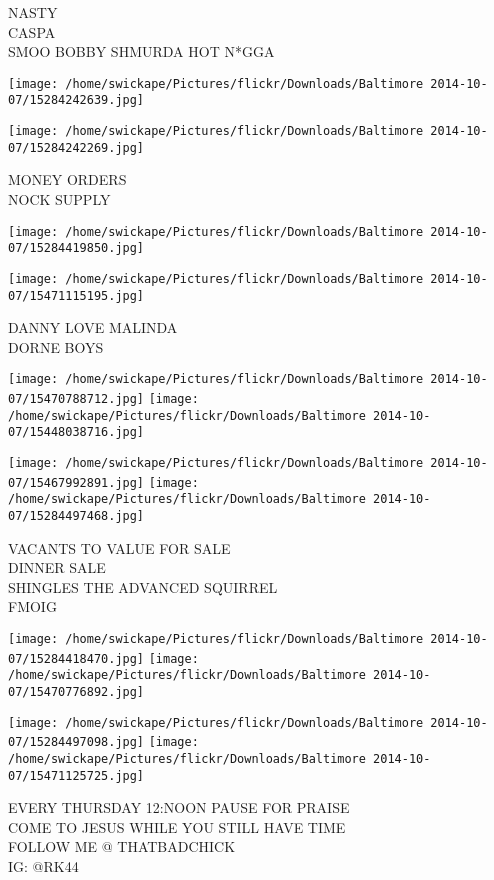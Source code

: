 \documentclass[10pt,letterpaper]{article}
\begin{document}
NASTY\\
CASPA\\
SMOO BOBBY SHMURDA HOT N*GGA
\pagebreak

\texttt{[image: /home/swickape/Pictures/flickr/Downloads/Baltimore 2014-10-07/15284242639.jpg]}

\vspace{0.25in}
\texttt{[image: /home/swickape/Pictures/flickr/Downloads/Baltimore 2014-10-07/15284242269.jpg]}

MONEY ORDERS\\
NOCK SUPPLY
\pagebreak

\texttt{[image: /home/swickape/Pictures/flickr/Downloads/Baltimore 2014-10-07/15284419850.jpg]}

\vspace{0.25in}
\texttt{[image: /home/swickape/Pictures/flickr/Downloads/Baltimore 2014-10-07/15471115195.jpg]}

DANNY LOVE MALINDA\\
DORNE BOYS
\pagebreak

\texttt{[image: /home/swickape/Pictures/flickr/Downloads/Baltimore 2014-10-07/15470788712.jpg]}
\texttt{[image: /home/swickape/Pictures/flickr/Downloads/Baltimore 2014-10-07/15448038716.jpg]}

\texttt{[image: /home/swickape/Pictures/flickr/Downloads/Baltimore 2014-10-07/15467992891.jpg]}
\texttt{[image: /home/swickape/Pictures/flickr/Downloads/Baltimore 2014-10-07/15284497468.jpg]}

VACANTS TO VALUE FOR SALE\\
DINNER SALE\\
SHINGLES THE ADVANCED SQUIRREL\\
FMOIG
\pagebreak

\texttt{[image: /home/swickape/Pictures/flickr/Downloads/Baltimore 2014-10-07/15284418470.jpg]}
\texttt{[image: /home/swickape/Pictures/flickr/Downloads/Baltimore 2014-10-07/15470776892.jpg]}

\texttt{[image: /home/swickape/Pictures/flickr/Downloads/Baltimore 2014-10-07/15284497098.jpg]}
\texttt{[image: /home/swickape/Pictures/flickr/Downloads/Baltimore 2014-10-07/15471125725.jpg]}

EVERY THURSDAY 12:NOON PAUSE FOR PRAISE\\
COME TO JESUS WHILE YOU STILL HAVE TIME\\
FOLLOW ME @ THATBADCHICK\\
IG: @RK44
\pagebreak
\end{document}
